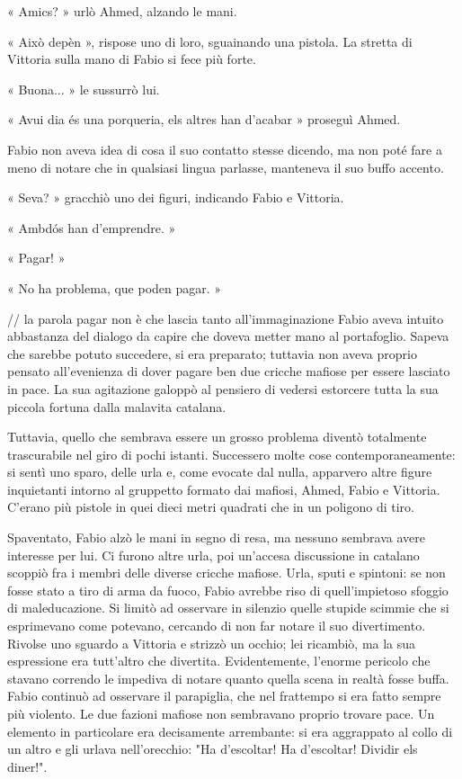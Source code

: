 « Amics? » urlò Ahmed, alzando le mani.

« Això depèn », rispose uno di loro, sguainando una pistola. La stretta di Vittoria sulla mano di Fabio si fece più forte.

« Buona... » le sussurrò lui.

« Avui dia és una porqueria, els altres han d'acabar » proseguì Ahmed.

Fabio non aveva idea di cosa il suo contatto stesse dicendo, ma non poté fare a meno di notare che in qualsiasi lingua parlasse, manteneva il suo buffo accento.

« Seva? » gracchiò uno dei figuri, indicando Fabio e Vittoria.

« Ambdós han d'emprendre. »

« Pagar! »

« No ha problema, que poden pagar. »

// la parola pagar non è che lascia tanto all'immaginazione
Fabio aveva intuito abbastanza del dialogo da capire che doveva metter mano al portafoglio. Sapeva che sarebbe potuto succedere, si era preparato; tuttavia non aveva proprio pensato all'evenienza di dover pagare ben due cricche mafiose per essere lasciato in pace. La sua agitazione galoppò al pensiero di vedersi estorcere tutta la sua piccola fortuna dalla malavita catalana.

Tuttavia, quello che sembrava essere un grosso problema diventò totalmente trascurabile nel giro di pochi istanti. Successero molte cose contemporaneamente: si sentì uno sparo, delle urla e, come evocate dal nulla, apparvero altre figure inquietanti intorno al gruppetto formato dai mafiosi, Ahmed, Fabio e Vittoria. C'erano più pistole in quei dieci metri quadrati che in un poligono di tiro.

Spaventato, Fabio alzò le mani in segno di resa, ma nessuno sembrava avere interesse per lui. Ci furono altre urla, poi un'accesa discussione in catalano scoppiò fra i membri delle diverse cricche mafiose. Urla, sputi e spintoni: se non fosse stato a tiro di arma da fuoco, Fabio avrebbe riso di quell'impietoso sfoggio di maleducazione. Si limitò ad osservare in silenzio quelle stupide scimmie che si esprimevano come potevano, cercando di non far notare il suo divertimento. Rivolse uno sguardo a Vittoria e strizzò un occhio; lei ricambiò, ma la sua espressione era tutt'altro che divertita. Evidentemente, l'enorme pericolo che stavano correndo le impediva di notare quanto quella scena in realtà fosse buffa. Fabio continuò ad osservare il parapiglia, che nel frattempo si era fatto sempre più violento. Le due fazioni mafiose non sembravano proprio trovare pace. Un elemento in particolare era decisamente arrembante: si era aggrappato al collo di un altro e gli urlava nell'orecchio: "Ha d'escoltar! Ha d'escoltar! Dividir els diner!".


